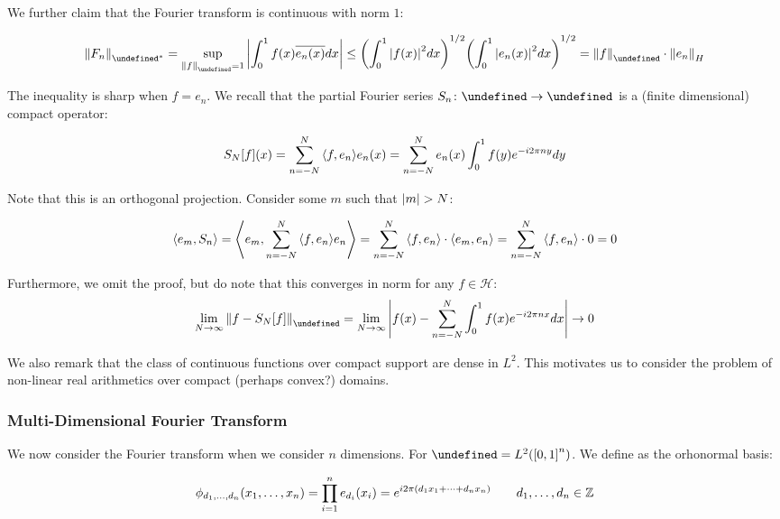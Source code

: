 \documentclass[12pt]{article}
\let\H\undefined
\newcommand{\H}{\mathcal{H}}
\begin{document}
We further claim that the Fourier transform is continuous with
norm $1$:

\begin{align*}
  \norm{F_n}_{\adj{\H}}
    = \sup_{\norm{f}_{\H} = 1}
        \abs{\int_0^1 f\parens{x} \overline{e_n \parens{x}} dx}
    \leq \parens{\int_0^1 \abs{f\parens{x}}^2 dx}^{1/2}
              \parens{\int_0^1 \abs{e_n \parens{x}}^2 dx}^{1/2}
    = \norm{f}_{\H} \cdot \norm{e_n}_{H}
\end{align*}

The inequality is sharp when $f = e_{n}$.
We recall that the partial Fourier series $\type{S_n}{\H}{\H}$ is a
(finite dimensional) compact operator:

\begin{align*}
  S_N {\left[f\right]} {\left(x\right)}
    = \sum_{n = -N}^{N} {\left\langle f, e_n\right\rangle} e_n {\left(x\right)}
    = \sum_{n = -N}^{N} e_n {\left(x\right)} \int_0^1 f(y) e^{- i 2 \pi n y} dy
\end{align*}

Note that this is an orthogonal projection.
Consider some $m$ such that
${\left\lvert m\right\rvert} > N$:

\begin{align*}
  {\left\langle e_m, S_n\right\rangle}
    = {\left\langle e_m, \sum_{n = -N}^{N} {\left\langle f, e_n\right\rangle} e_n\right\rangle}
    = \sum_{n = -N}^{N} {\left\langle f, e_n\right\rangle} \cdot {\left\langle e_m, e_n\right\rangle}
    = \sum_{n = -N}^{N} {\left\langle f, e_n\right\rangle} \cdot 0
    = 0
\end{align*}

Furthermore, we omit the proof, but do note that this converges in norm
for any $f \in \mathcal{H}$:
\begin{align*}
  \lim_{N \to \infty} \norm{f - S_N \brackets{f}}_{\H}
    = \lim_{N \to \infty}
      \abs{f\parens{x} -
            \sum_{n = -N}^{N} \int_0^1 f\parens{x} e^{-i 2\pi nx} dx}
    \to 0
\end{align*}

We also remark that the class of continuous functions over
compact support are dense in $L^2$.
This motivates us to consider the problem of non-linear real arithmetics
over compact (perhaps convex?) domains.


\subsubsection{Multi-Dimensional Fourier Transform}
We now consider the Fourier transform when we consider $n$ dimensions.
For $\H = L^2 \parens{\brackets{0, 1}^n}$.
We define as the orhonormal basis:

\begin{align*}
  \phi_{d_1, \ldots, d_n} {\left(x_1, \ldots, x_n\right)}
    = \prod_{i = 1}^{n} e_{d_i} {\left(x_i\right)}
    = e^{i 2 \pi {\left(d_1 x_1 + \cdots + d_n x_n\right)}}
    \qquad
    d_1, \ldots, d_n \in {\mathbb{Z}}
\end{align*}
\end{document}
